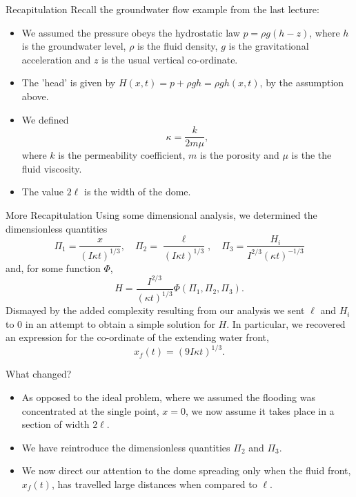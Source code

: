 \documentclass[10pt]{beamer}
\begin{document}
\begin{frame}{Recapitulation}
  Recall the groundwater flow example from the last lecture:
  \begin{itemize}
  \item
    We assumed the pressure obeys the hydrostatic law $p = \rho g(h-z)$, where $h$ is the groundwater level, $\rho$ is the fluid density, $g$ is the gravitational acceleration and $z$ is the usual vertical co-ordinate.
  \item
    The 'head' is given by $H(x,t) = p + \rho gh = \rho gh(x,t)$, by the assumption above.
  \item
    We defined $$\kappa = \frac{k}{2m\mu},$$ where $k$ is the permeability coefficient, $m$ is the porosity and $\mu$ is the the fluid viscosity.
    \item
      The value $2\ell$ is the width of the dome.
  \end{itemize}
\end{frame}
\begin{frame}{More Recapitulation}
  Using some dimensional analysis, we determined the dimensionless quantities
  $$\Pi_1 = \frac{x}{(I\kappa t)^{1/3}}, \quad \Pi_2 = \frac{\ell}{(I\kappa t)^{1/3}}, \quad \Pi_3 = \frac{H_i}{I^{2/3}(\kappa t)^{-1/3}}$$
  and, for some function $\Phi$,
  $$H = \frac{I^{2/3}}{(\kappa t)^{1/3}} \Phi(\Pi_1, \Pi_2, \Pi_3).$$
  Dismayed by the added complexity resulting from our analysis we sent $\ell$ and $H_i$ to 0 in an attempt to obtain a simple solution for $H$.  
  In particular, we recovered an expression for the co-ordinate of the extending water front, $$x_f(t) = (9I\kappa t)^{1/3}.$$
\end{frame}

\begin{frame}{What changed?}
  \begin{itemize}
  \item
    As opposed to the ideal problem, where we assumed the flooding was concentrated at the single point, $x=0$, we now assume it takes place in a section of width $2\ell$.
  \item
    We have reintroduce the dimensionless quantities $\Pi_2$ and $\Pi_3$.
  \item
    We now direct our attention to the dome spreading only when the fluid front, $x_f(t)$, has travelled large distances when compared to $\ell$.
  \end{itemize}
\end{frame}
\end{document}
